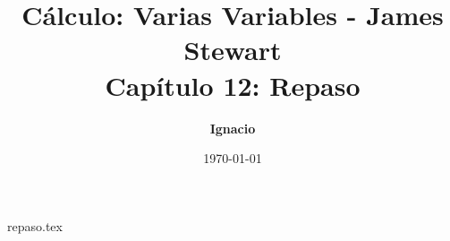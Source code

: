 \documentclass[11pt,spanish,oneside]{report}
\title{\textbf{Cálculo: Varias Variables - James Stewart} \\ \Large Capítulo 12: Repaso}
\author{\textbf{Ignacio}}
\date{\today}
\begin{document}
\maketitle

{repaso.tex}
\end{document}
